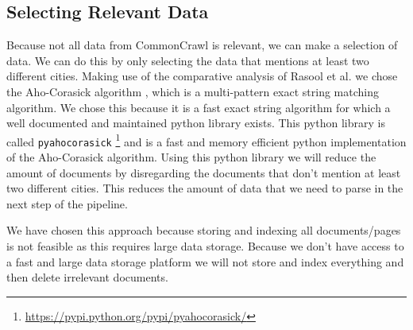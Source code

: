 \subsection{Selecting Relevant Data}
Because not all data from  CommonCrawl is relevant, we can make a selection of data. We can do this by only selecting the data that mentions at least two different cities. Making use of the comparative analysis of Rasool et al. \cite{rasool2012string} we chose the Aho-Corasick algorithm \cite{Aho-Corasick}, which is a multi-pattern exact string matching algorithm. We chose this because it is a fast exact string algorithm for which a well documented and maintained python library exists. This python library is called \texttt{pyahocorasick} \footnote{\url{https://pypi.python.org/pypi/pyahocorasick/}}  and is a fast and memory efficient python implementation of the Aho-Corasick algorithm. Using this python library we will reduce the amount of documents by disregarding the documents that don't mention at least two different cities. This reduces the amount of data that we need to parse in the next step of the pipeline.

We have chosen this approach because storing and indexing all documents/pages is not feasible as this requires large data storage. Because we don't have access to a fast and large data storage platform we will not store and index everything and then delete irrelevant documents.
